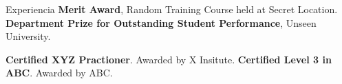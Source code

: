 \begin{rubric}{Experiencia}
	\entry*[2002] \textbf{Merit Award}, Random Training Course held at Secret Location.
	\entry*[2001] \textbf{Department Prize for Outstanding Student Performance}, Unseen University.

	\entry*[2014] \textbf{Certified XYZ Practioner}. Awarded by X Insitute.
	\entry*[2006] \textbf{Certified Level 3 in ABC}. Awarded by ABC.

\end{rubric}
